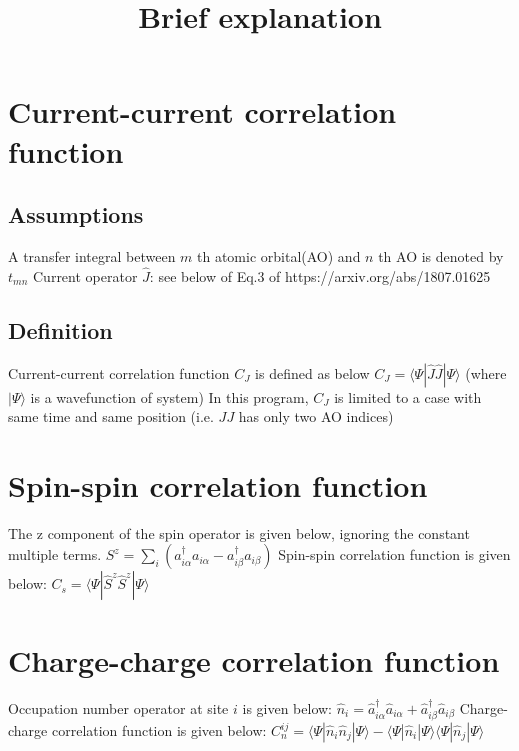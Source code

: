 \documentclass{article}
\begin{document}
\title{Brief explanation}
\maketitle


\section{Current-current correlation function}
\subsection{Assumptions}

A transfer integral between $m$ th atomic orbital(AO) and $n$ th AO is denoted by $t_{mn}$
Current operator $\hat{J}$: see below of Eq.3 of https://arxiv.org/abs/1807.01625

\subsection{Definition}
Current-current correlation function $C_{J}$ is defined as below
$C_{J} = \langle \Psi | \hat{J}\hat{J} | \Psi \rangle$ 
(where $|\Psi\rangle$ is a wavefunction of system)
In this program, $C_{J}$ is limited to a case with same time and same position (i.e. $JJ$ has only two AO indices)

\section{Spin-spin correlation function}
The z component of the spin operator is given below, ignoring the constant multiple terms.
$S^{z} = \sum_{i} (a^{\dagger}_{i\alpha}a_{i\alpha} - a^{\dagger}_{i\beta}a_{i\beta})$
Spin-spin correlation function is given below:
$C_{s} = \langle \Psi | \hat{S}^{z}\hat{S}^{z} | \Psi \rangle$

\section{Charge-charge correlation function}
Occupation number operator at site $i$ is given below:
$\hat{n}_{i} = \hat{a}^{\dagger}_{i\alpha}\hat{a}_{i\alpha} + \hat{a}^{\dagger}_{i\beta}\hat{a}_{i\beta}$
Charge-charge correlation function is given below:
$C_{n}^{ij} = \langle \Psi | \hat{n}_{i}\hat{n}_{j} | \Psi \rangle
- \langle \Psi | \hat{n}_{i} | \Psi \rangle
\langle \Psi | \hat{n}_{j} | \Psi \rangle$
\end{document}
